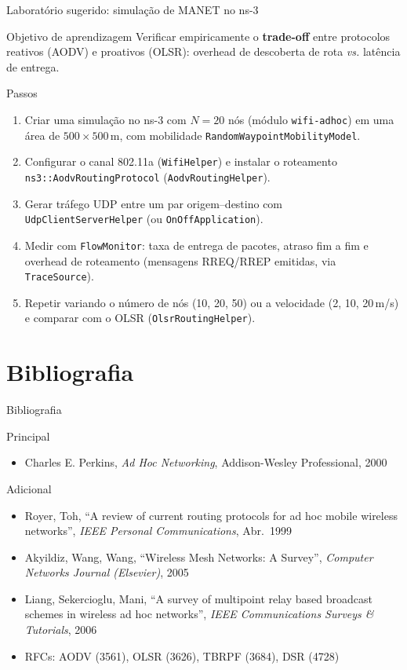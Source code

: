 \documentclass[aspectratio=169,11pt]{beamer}
\begin{document}
\begin{frame}{Laboratório sugerido: simulação de MANET no ns-3}
  \begin{block}{Objetivo de aprendizagem}
    Verificar empiricamente o \textbf{trade-off} entre protocolos reativos (AODV) e proativos (OLSR): overhead de descoberta de rota \emph{vs.} latência de entrega.
  \end{block}
  \begin{block}{Passos}
    \begin{enumerate}
      \item Criar uma simulação no ns-3 com $N = 20$ nós (módulo \texttt{wifi-adhoc}) em uma área de $500\times 500$\,m, com mobilidade \texttt{RandomWaypointMobilityModel}.
      \item Configurar o canal 802.11a (\texttt{WifiHelper}) e instalar o roteamento \texttt{ns3::AodvRoutingProtocol} (\texttt{AodvRoutingHelper}).
      \item Gerar tráfego UDP entre um par origem--destino com \texttt{UdpClientServerHelper} (ou \texttt{OnOffApplication}).
      \item Medir com \texttt{FlowMonitor}: taxa de entrega de pacotes, atraso fim a fim e overhead de roteamento (mensagens RREQ/RREP emitidas, via \texttt{TraceSource}).
      \item Repetir variando o número de nós (10, 20, 50) ou a velocidade (2, 10, 20\,m/s) e comparar com o OLSR (\texttt{OlsrRoutingHelper}).
    \end{enumerate}
  \end{block}
\end{frame}

\section{Bibliografia}

\begin{frame}{Bibliografia}
  \begin{block}{Principal}
    \begin{itemize}
      \item Charles E. Perkins, \emph{Ad Hoc Networking}, Addison-Wesley Professional, 2000
    \end{itemize}
  \end{block}
  \begin{block}{Adicional}
    \begin{itemize}
      \item Royer, Toh, ``A review of current routing protocols for ad hoc mobile wireless networks'', \emph{IEEE Personal Communications}, Abr.~1999
      \item Akyildiz, Wang, Wang, ``Wireless Mesh Networks: A Survey'', \emph{Computer Networks Journal (Elsevier)}, 2005
      \item Liang, Sekercioglu, Mani, ``A survey of multipoint relay based broadcast schemes in wireless ad hoc networks'', \emph{IEEE Communications Surveys \& Tutorials}, 2006
      \item RFCs: AODV (3561), OLSR (3626), TBRPF (3684), DSR (4728)
    \end{itemize}
  \end{block}
\end{frame}
\end{document}
